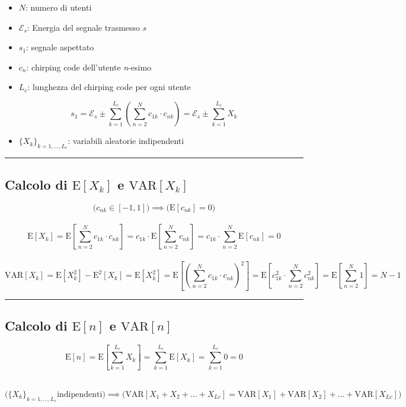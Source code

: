 \begin{itemize}[itemsep=0pt]
	\item $N$: numero di utenti
	\item $\mathcal{E}_s$: Energia del segnale trasmesso $s$ 
	\item $s_1$: segnale aspettato 
	\item $c_n$: chirping code dell'utente \textit{n}-esimo
	\item $L_c$: lunghezza del chirping code per ogni utente
\end{itemize}

\[
s_1 = \mathcal{E}_s \pm \sum_{k=1}^{L_c}\left(\sum_{n=2}^{N}c_{1k}\cdot c_{nk}\right)
= \mathcal{E}_s \pm \sum_{k=1}^{L_c}X_k
\] 

\begin{itemize}[itemsep=0pt]
	\item $\{X_k\}_{k=1,\dots,L_c}$: variabili aleatorie indipendenti
\end{itemize}
\hrule

\subsection{Calcolo di $\mathrm{E}[X_k]$ e $\mathrm{VAR}[X_k]$}
\[
\Bigg( c_{nk}\in [-1,1] \Bigg) \implies \Bigg( \mathrm{E}[c_{nk}] = 0 \Bigg)
\] \\\vspace{-.5cm} \[
\mathrm{\mathrm{E}}[X_k] = \mathrm{E}\left[\sum_{n=2}^{N}c_{1k}\cdot c_{nk}\right] 
= c_{1k}\cdot \mathrm{E}\left[\sum_{n=2}^{N}c_{nk}\right]
= c_{1k}\cdot \sum_{n=2}^{N}\mathrm{E}[c_{nk}] 
= 0
\] \\\vspace{-.5cm} \[
\mathrm{VAR}[X_k] = \mathrm{E}[X_k^2] - \mathrm{E}^2[X_k] = \mathrm{E}[X_k^2] = \mathrm{E}\left[\left(\sum_{n=2}^{N}c_{1k}\cdot c_{nk}\right)^2\right] =
\mathrm{E}\left[ c_{1k}^2\cdot \sum_{n=2}^{N}c_{nk}^2 \right] =
\mathrm{E}\left[ \sum_{n=2}^{N}1 \right] =
N-1
\]
\hrule

\subsection{Calcolo di $\mathrm{E}[n]$ e $\mathrm{VAR}[n]$}
\[
\mathrm{E}[n] = \mathrm{E}\left[ \sum_{k=1}^{L_c}X_k \right] =
\sum_{k=1}^{L_c}\mathrm{E}\left[ X_k \right] = \sum_{k=1}^{L_c}0 = 0
\] \\\vspace{-1.3cm} 

\[
\Bigg( \{X_k\}_{k=1,\dots,L_c}	\text{indipendenti} \Bigg) \implies \Bigg(
\mathrm{VAR}[X_1+X_2+\dots+X_{Lc}] = \mathrm{VAR}[X_1]+\mathrm{VAR}[X_2]+\dots+\mathrm{VAR}[X_{Lc}] \Bigg)
\] \\\vspace{-1.2cm} 

